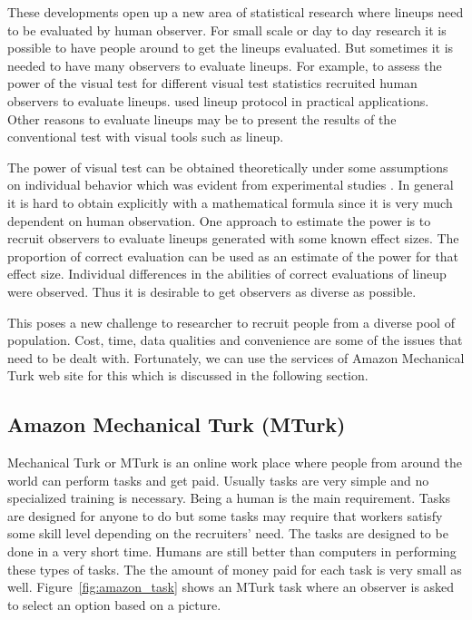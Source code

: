 \documentclass[11pt]{article}
\begin{document}
These developments open up a new area of statistical research where lineups need to be evaluated by human observer. For small scale or day to day research it is possible to have people around to get the lineups evaluated. But sometimes it is needed to have many observers to evaluate lineups. For example, to assess the power of the visual test for different visual test statistics \cite{heike:2012} recruited human observers to evaluate lineups.  \cite{niladri:2012} used lineup protocol in practical applications. Other reasons to evaluate lineups may be to present the results of the conventional test with visual tools such as lineup.  




The power of visual test can be obtained theoretically under some assumptions on individual behavior which was evident from experimental studies \citep{majumder:2013}. In general it is hard to obtain explicitly with a mathematical formula since it is very much dependent on human observation. One approach to estimate the power is to recruit observers to evaluate lineups generated with some known effect sizes. The proportion of correct evaluation can be used as an estimate of the power for that effect size. Individual differences in the abilities of correct evaluations of lineup were observed. Thus it is desirable to get observers as diverse as possible.  


This poses a new challenge to researcher to recruit people from a diverse pool of population. Cost, time, data qualities and convenience are some of the issues that need to be dealt with. Fortunately, we can use the services of Amazon Mechanical Turk web site for this which is discussed in the following section.

\subsection{Amazon Mechanical Turk (MTurk)}

\cite{turk} Mechanical Turk  or MTurk is an online work place where people from around the world can perform tasks and get paid. Usually tasks are very simple and no specialized training is necessary. Being a human is the main requirement. Tasks are designed for anyone to do but some tasks may require that workers satisfy some skill level depending on the recruiters' need. The tasks are designed to be done in a very short time. Humans are still better than computers in performing these types of tasks. The the amount of money paid for each task is very small as well. Figure~\ref{fig:amazon_task} shows an MTurk task where an observer is asked to select an option based on a picture. 
\end{document}
